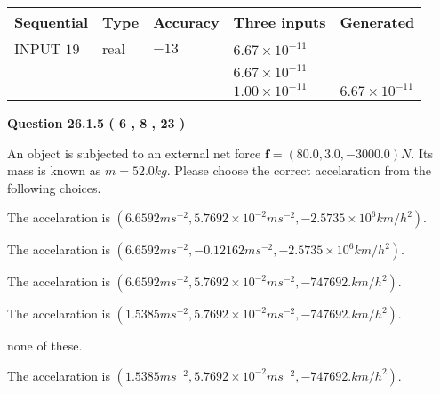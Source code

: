 \documentclass[12pt]{article}
\begin{document}
   
  
  
\noindent\begin{tabular}{|l|l|l|l|l|}
\hline
 Sequential & Type & Accuracy & Three inputs & Generated \\ 
\hline
 
 
  INPUT $           19 $ & real & $          -13  $ & $
 6.67 \times 10^{-11}
  $ & \\
  & & &  $
 6.67 \times 10^{-11}
  $ & \\
  & & &  $
 1.00 \times 10^{-11}
 $ & $ 6.67 \times 10^{-11} $ 
 \\  \hline  
 \end{tabular}
   
   
  
\vspace{0.2in}
  
{\textbf{\Large{Question
26.1.5 
 (           6 ,           8 ,          23 )
}}}
  
  
 
An object is subjected to an external net force $\mathbf{f}=(
80.0 ,
3.0,
-3000.0  )N$. Its mass is known as
$m= %
52.0  kg$. Please choose the correct accelaration
from the following choices.
 
 
 
The accelaration is
$(
6.6592ms^{-2},
5.7692 \times 10^{-2}ms^{-2},
-2.5735 \times 10^{6}km/h^2
).
$
 
 
The accelaration is
$(
6.6592ms^{-2},
-0.12162ms^{-2},
-2.5735 \times 10^{6}km/h^2
).
$
 
 
The accelaration is
$(
6.6592ms^{-2},
5.7692 \times 10^{-2}ms^{-2},
-747692.km/h^2
).
$
 
 
The accelaration is
$(
1.5385ms^{-2},
5.7692 \times 10^{-2}ms^{-2},
-747692.km/h^2
).
$
 
 
none of these.
 
 
\noindent{}
 
 
The accelaration is
$(
1.5385ms^{-2},
5.7692 \times 10^{-2}ms^{-2},
-747692.km/h^2
).
$
 
 
\noindent{}
 
 
 
 
 
\end{document}
